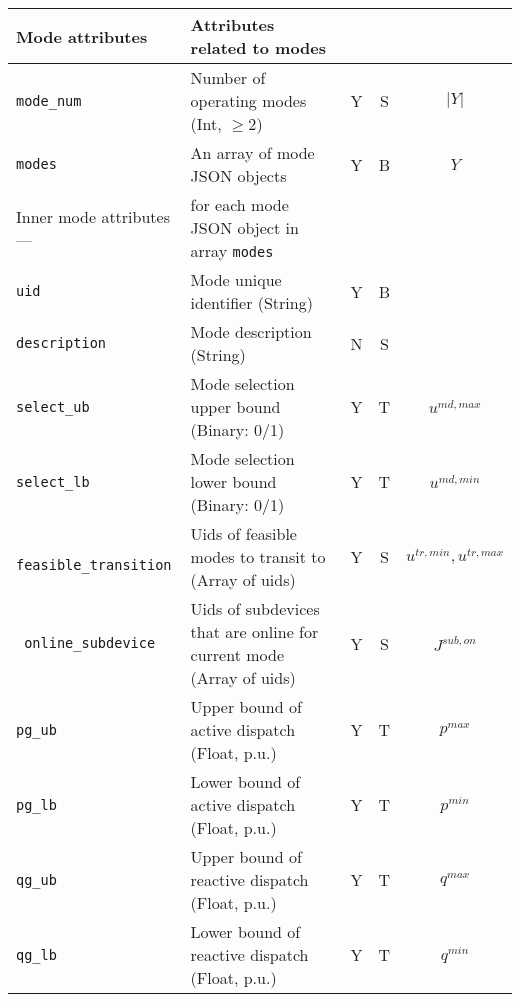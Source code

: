 \documentclass{article}
\begin{document}
\begin{center}
\small
\begin{tabular}{ l | l | c | c | c |}
  Mode attributes & Attributes related to modes  &  &  & \\
  \hline
  {\tt mode\_num} & Number of operating modes (Int, $\geq 2$) & Y & S & $\lvert Y \rvert$ \\
  {\tt modes} & An array of mode JSON objects  & Y & B & $Y$ \\
  \hline \hline
  Inner mode attributes --- & for each mode JSON object in array {\tt modes} &  &  & \\
  \hline    
  {\tt uid} & Mode unique identifier (String) & Y & B &  \\
  {\tt description} & Mode description (String) & N & S &  \\
  {\tt select\_ub} & Mode selection upper bound (Binary: 0/1) & Y & T & $u^{md,max}$\\
  {\tt select\_lb} & Mode selection lower bound (Binary: 0/1) & Y & T & $u^{md,min}$\\
  {\tt\color{red} feasible\_transition} & Uids of feasible modes to transit to (Array of uids) & Y & S & $u^{tr,min}, u^{tr,max}$\\
  {\tt\color{red} online\_subdevice} & Uids of subdevices that are online for current mode (Array of uids) & Y & S & $J^{sub,on}$\\
  {\tt pg\_ub} & Upper bound of active dispatch (Float, p.u.) & Y & T & $p^{max}$ \\
  {\tt pg\_lb} & Lower bound of active dispatch (Float, p.u.) & Y & T & $p^{min}$ \\
  {\tt qg\_ub} & Upper bound of reactive dispatch (Float, p.u.)& Y & T & $q^{max}$\\
  {\tt qg\_lb} & Lower bound of reactive dispatch (Float, p.u.)& Y & T & $q^{min}$\\ 


\end{tabular}
\end{center}
\end{document}
